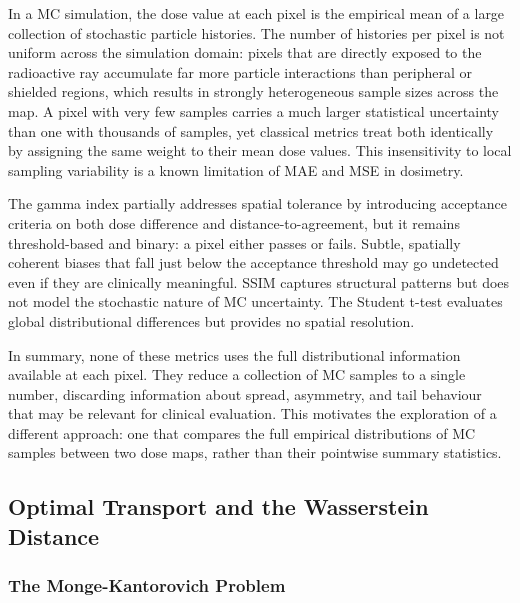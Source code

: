 \documentclass[12pt]{article}
\begin{document}
In a MC simulation, the dose value at each pixel is the empirical mean of a large
collection of stochastic particle histories. The number of histories per pixel is not
uniform across the simulation domain: pixels that are directly exposed to the radioactive ray
accumulate far more particle interactions than peripheral or shielded regions, which
results in strongly heterogeneous sample sizes across the map. A pixel with very few
samples carries a much larger statistical uncertainty than one with thousands of
samples, yet classical metrics treat both identically by assigning the same weight to
their mean dose values. This insensitivity to local sampling variability is a known
limitation of MAE and MSE in dosimetry.

The gamma index partially addresses spatial tolerance by introducing acceptance
criteria on both dose difference and distance-to-agreement, but it remains
threshold-based and binary: a pixel either passes or fails. Subtle, spatially coherent
biases that fall just below the acceptance threshold may go undetected even if they
are clinically meaningful. SSIM captures structural patterns but does not model the
stochastic nature of MC uncertainty. The Student t-test evaluates global distributional
differences but provides no spatial resolution.

In summary, none of these metrics uses the full distributional information available
at each pixel. They reduce a collection of MC samples to a single number, discarding
information about spread, asymmetry, and tail behaviour that may be relevant for
clinical evaluation. This motivates the exploration of a different approach: one that
compares the full empirical distributions of MC samples between two dose maps, rather
than their pointwise summary statistics.

\subsection{Optimal Transport and the Wasserstein Distance}

\subsubsection{The Monge-Kantorovich Problem}
\end{document}
